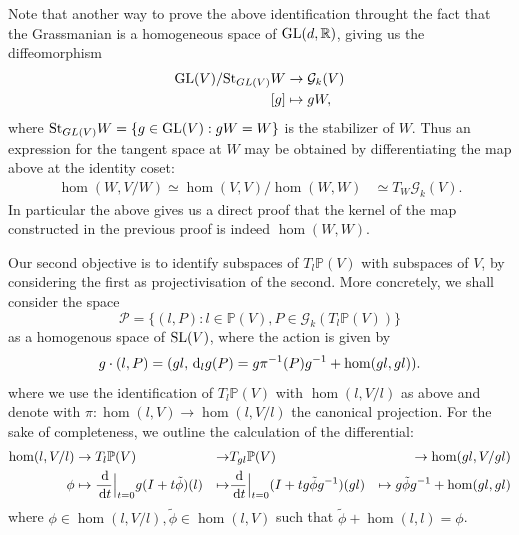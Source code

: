 \documentclass{report}
\begin{document}
Note that another way to prove the above identification throught the fact that the Grassmanian is a homogeneous space of $\operatorname{{\mathrm{GL}}}(d, \mathbb R)$, giving us the diffeomorphism
\begin{align*}
    \operatorname{{\mathrm{GL}}}(V) / \mathrm{St}_{GL(V)} W &\to \mathcal G_k(V)\\
    [g] &\mapsto gW,
\end{align*}
where $\mathrm{St}_{GL(V)} W = \{ g \in \operatorname{{\mathrm{GL}}}(V) : gW = W \}$ is the stabilizer of $W$.
Thus an expression for the tangent space at $W$ may be obtained by differentiating the map above at the identity coset:
\begin{align*}
    \hom(W, V/W) \simeq \hom(V, V) / \hom(W, W) &\simeq T_W \mathcal G_k(V).
\end{align*}
In particular the above gives us a direct proof that the kernel of the map constructed in the previous proof is indeed $\hom(W, W)$.

Our second objective is to identify subspaces of $T_l \mathbb P(V)$ with subspaces of $V$, by considering the first as projectivisation of the second.
More concretely, we shall consider the space
\[
    \mathcal P = \{ (l, P) : l \in \mathbb P(V), P \in \mathcal G_k( T_l \mathbb P(V) )  \}
\]
as a homogenous space of $\operatorname{{\mathrm{SL}}}(V)$, where the action is given by
\begin{align*}
g \cdot (l, P) = (g l, \,\mathrm{d}_l g (P) = g \pi^{-1}(P) g^{-1} + \hom(gl, gl)).
\end{align*}
where we use the identification of $T_l \mathbb P(V)$ with $\hom(l, V/l)$ as above and denote with $\pi : \hom(l, V) \to \hom(l, V/l)$ the canonical projection.
For the sake of completeness, we outline the calculation of the differential:
\begin{align*}
    \hom(l, V/l) &\to T_l \mathbb P(V) &\to &T_{gl} \mathbb P(V) &\to \hom(gl, V/gl)\\
    \phi &\mapsto \frac{\,\mathrm{d}}{\,\mathrm{d} t} \Big|_{t=0} g(I + t \tilde \phi)(l) &\mapsto &\frac{\,\mathrm{d}}{\,\mathrm{d} t} \Big|_{t=0} (I + t g\tilde \phi g^{-1})(g l) &\mapsto g \tilde \phi g^{-1} + \hom(gl, gl)
\end{align*}
where $\phi \in \hom(l, V/l), \tilde \phi \in \hom(l, V)$ such that $\tilde \phi + \hom(l, l) = \phi$.
\end{document}
